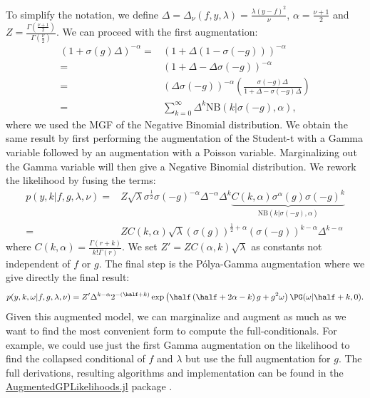 To simplify the notation, we define $\Delta=\Delta_\nu(f,y,\lambda) = \frac{\lambda(y-f)^2}{\nu}$, $\alpha =\frac{\nu+1}{2}$ and $Z = \frac{\Gamma(\frac{\nu+1}{2})}{\Gamma(\frac{\nu}{2})}$.
We can proceed with the first augmentation:
\begin{align*}
    (1 + \sigma(g)\Delta)^{-\alpha} =& (1 + \Delta(1 - \sigma(-g)))^{-\alpha}\\
    =&(1 + \Delta - \Delta\sigma(-g))^{-\alpha}\\
    =& (\Delta\sigma(-g))^{-\alpha}\left(\frac{\sigma(-g)\Delta}{1 + \Delta -\sigma(-g)\Delta}\right)\\
    =&\sum_{k=0}^{\infty} \Delta^k \mathrm{NB}(k|\sigma(-g),\alpha),
\end{align*}
where we used the \ac{MGF} of the Negative Binomial distribution.
We obtain the same result by first performing the augmentation of the Student-t with a Gamma variable followed by an augmentation with a Poisson variable.
Marginalizing out the Gamma variable will then give a Negative Binomial distribution.
We rework the likelihood by fusing the terms:
\begin{align*}
    p(y,k|f,g,\lambda,\nu) =& Z\sqrt{\lambda}\sigma^{\frac{1}{2}}\sigma(-g)^{-\alpha}\Delta^{-\alpha}\Delta^k\underbrace{C(k,\alpha)\sigma^{\alpha}(g)\sigma(-g)^k}_{\mathrm{NB}(k|\sigma(-g),\alpha)}\\
    =& ZC(k,\alpha)\sqrt{\lambda}(\sigma(g))^{\frac{1}{2}+\alpha}(\sigma(-g))^{k-\alpha}\Delta^{k-\alpha}
\end{align*}
where $C(k, \alpha) = \frac{\Gamma(r + k)}{k!\Gamma(r)}$.
We set $Z'=ZC(\alpha,k)\sqrt{\lambda}$ as constants not independent of $f$ or $g$.
The final step is the P\'olya-Gamma augmentation where we give directly the final result:
\begin{align}
    p(y,k,\omega|f,g,\lambda,\nu) = Z'\Delta^{k-\alpha}2^{-(\half+k)}\exp\left(\half\left(\half + 2\alpha - k\right)g + g^2\omega\right)\PG(\omega|\half+k,0).
\end{align}
Given this augmented model, we can marginalize and augment as much as we want to find the most convenient form to compute the full-conditionals.
For example, we could use just the first Gamma augmentation on the likelihood to find the collapsed conditional of $f$ and $\lambda$ but use the full augmentation for $g$.
The full derivations, resulting algorithms and implementation can be found in the  \href{https://github.com/JuliaGaussianProcesses/AugmentedGPLikelihoods.jl}{AugmentedGPLikelihoods.jl} package \cite{theo_galy_fajou_2022_6347022}.

